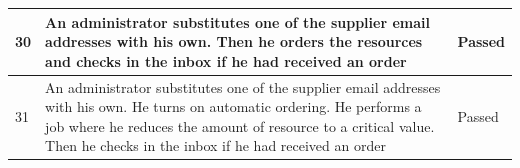 \documentclass[a4paper,11pt,twoside]{report}
\theoremstyle{definition}
\begin{document}
\begin{longtable}{|p{1cm}|p{11cm}|p{4cm}|}
30 & An administrator substitutes one of the supplier email addresses with his own. Then he orders the resources and checks in the inbox if he had received an order & Passed \\ \hline

31 & An administrator substitutes one of the supplier email addresses with his own. He turns on automatic ordering. He performs a job where he reduces the amount of resource to a critical value. Then he checks in the inbox if he had received an order & Passed \\ \hline


\end{longtable}

\thispagestyle{empty}
\end{document}
